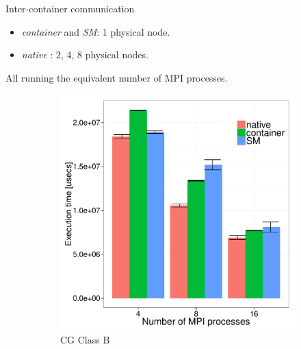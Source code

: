 \documentclass[presentation]{beamer}
\begin{document}
\begin{frame}[label=sec-3-5]{Inter-container communication}
\begin{itemize}
\item \emph{container} and \emph{SM}: 1 physical node.
\item \emph{native} : 2, 4, 8 physical nodes.
\end{itemize}

All running the equivalent number of MPI processes.

\begin{figure}[H]
  \centering
\begin{subfigure}[b]{0.42\textwidth}
    \includegraphics[scale=0.25,angle=0]{figures/inter-container-mgC.pdf}
    \caption{CG Class B}
  \end{subfigure}
  \begin{subfigure}[b]{0.42\textwidth}

\end{subfigure}
\end{figure}
\end{frame}
\end{document}
